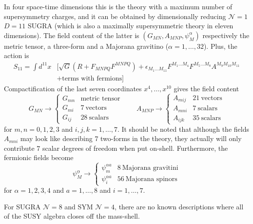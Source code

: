 \documentclass[a4paper,12pt]{article}
\numberwithin{equation}{section}
\numberwithin{exe}{section}
\renewcommand{\a}{{\alpha}}
\newcommand{\e}{{\epsilon}}
\begin{document}
\begin{itemize}
	In four space-time dimensions this is the theory with a maximum number of supersymmetry charges, and it can be obtained by dimensionally reducing $\mathcal N=1$ $D=11$ SUGRA (which is also a maximally supersymmetric theory in eleven dimensions). The field content of the latter is $(G_{MN}, A_{MNP}, \psi^\a_M)$ respectively the metric tensor, a three-form and a Majorana gravitino ($\a=1,\ldots,32$). Plus, the action is
	\begin{align}
	S_{11} = \int d^{11}x & \Big[\sqrt{G} (R+F_{MNPQ}F^{MNPQ}) + \e_{M_1\ldots M_{11}}F^{M_1\ldots M_4} F^{M_5\ldots M_8} A^{M_9 M_{10} M_{11}} \nonumber  \\
	& + \text{terms with fermions}\Big]
	\end{align}
	Compactification of the last seven coordinates $x^4,\ldots,x^{10}$ gives the field content
	\begin{equation}
	G_{MN}\rightarrow \left\{
		\begin{array}{ll}
		G_{mn} & \text{metric tensor} \\
		G_{mi} & 7\ \text{vectors} \\
		G_{ij} & 28\ \text{scalars}
		\end{array}
	\right.\qquad A_{MNP}\rightarrow \left\{
		\begin{array}{ll}
		A_{mij} & 21\ \text{vectors} \\
		A_{mni} & 7\ \text{scalars} \\
		A_{ijk} & 35\ \text{scalars}
		\end{array}
	\right.
	\end{equation}
	for $m,n=0,1,2,3$ and $i,j,k=1,\ldots, 7$. It should be noted that although the fields $A_{mni}$ may look like describing $7$ two-forms in the theory, they actually will only contribute $7$ scalar degrees of freedom when put on-shell. Furthermore, the fermionic fields become
	\begin{equation}
	\psi_M^{\underline\a} \rightarrow \left\{
		\begin{array}{ll}
		\psi_m^{\a a} & 8\ \text{Majorana gravitini} \\
		\psi_i^{\a a} & 56\ \text{Majorana spinors}
		\end{array}
	\right.
	\end{equation}
	for $\a=1,2,3,4$ and $a=1,\ldots,8$ and $i=1,\ldots,7$.
	
	\end{itemize}
For SUGRA $\mathcal N=8$ and SYM $\mathcal N=4$, there are no known descriptions where all of the SUSY algebra closes off the mass-shell.
\end{document}
